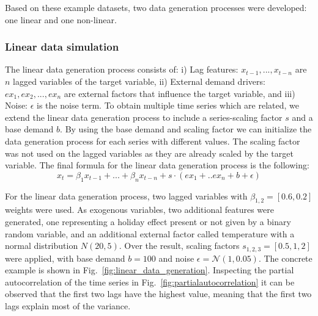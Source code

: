 Based on these example datasets, two data generation processes were developed: one linear and one non-linear.

\subsubsection[Linear data simulation] {Linear data simulation}
\label{sec:linear_data_simulation}



The linear data generation process consists of:
i) Lag features: $x_{t-1},  ..., x_{t-n}$ are $n$ lagged variables of the target variable, ii) External demand drivers: $ex_1, ex_2, ..., ex_n$ are external factors that influence the target variable, and iii) Noise: $\epsilon$ is the noise term.
To obtain multiple time series which are related, we extend the linear data generation process to include a series-scaling factor $s$ and a base demand $b$.
By using the base demand and scaling factor we can initialize the data generation process for each series with different values.
The scaling factor was not used on the lagged variables as they are already scaled by the target variable.
The final formula for the linear data generation process is the following:
$$
x_t = \beta_1 x_{t-1} + ... + \beta_n x_{t-n} + s \cdot ( ex_1 + .. ex_n + b + \epsilon)
$$




For the linear data generation process, two lagged variables with $\beta_{1,2} = [0.6,0.2]$ weights were used.
As exogenous variables, two additional features were generated, one representing a holiday effect present or not given by a binary random variable, and an additional external factor called temperature with a normal distribution $N(20,5)$.
Over the result, scaling factors $s_{1,2,3} = [0.5,1,2]$ were applied, with base demand $b=100$ and noise $\epsilon = \mathcal{N}(1,0.05)$.
The concrete example is shown in Fig.~\ref{fig:linear_data_generation}.
Inspecting the partial autocorrelation of the time series in Fig.~\ref{fig:partialautocorrelation} it can be observed that the first two lags have the highest value, meaning that the first two lags explain most of the variance.

